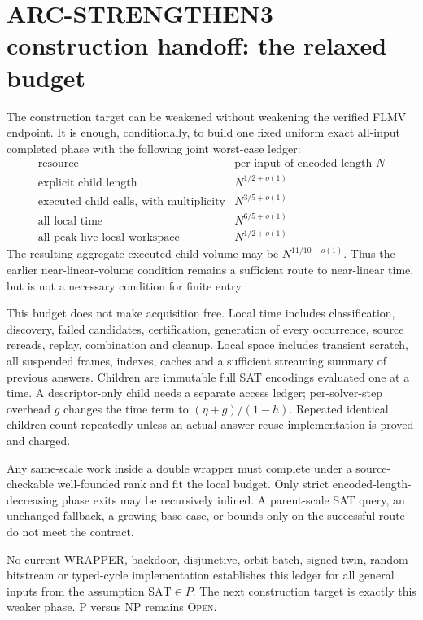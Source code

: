 \section*{ARC-STRENGTHEN3 construction handoff: the relaxed budget}

The construction target can be weakened without weakening the verified FLMV
endpoint.  It is enough, conditionally, to build one fixed uniform exact
all-input completed phase with the following joint worst-case ledger:
\[
\begin{array}{c|c}
\text{resource} & \text{per input of encoded length }N\\ \hline
\text{explicit child length} & N^{1/2+o(1)}\\
\text{executed child calls, with multiplicity} & N^{3/5+o(1)}\\
\text{all local time} & N^{6/5+o(1)}\\
\text{all peak live local workspace} & N^{1/2+o(1)}
\end{array}
\]
The resulting aggregate executed child volume may be
$N^{11/10+o(1)}$.  Thus the earlier near-linear-volume condition remains a
sufficient route to near-linear time, but is not a necessary condition for
finite entry.

This budget does not make acquisition free.  Local time includes
classification, discovery, failed candidates, certification, generation of
every occurrence, source rereads, replay, combination and cleanup.  Local
space includes transient scratch, all suspended frames, indexes, caches and
a sufficient streaming summary of previous answers.  Children are immutable
full SAT encodings evaluated one at a time.  A descriptor-only child needs a
separate access ledger; per-solver-step overhead $g$ changes the time term to
$(\eta+g)/(1-h)$.  Repeated identical children count repeatedly unless an
actual answer-reuse implementation is proved and charged.

Any same-scale work inside a double wrapper must complete under a
source-checkable well-founded rank and fit the local budget.  Only strict
encoded-length-decreasing phase exits may be recursively inlined.  A
parent-scale SAT query, an unchanged fallback, a growing base case, or bounds
only on the successful route do not meet the contract.

No current WRAPPER, backdoor, disjunctive, orbit-batch, signed-twin,
random-bitstream or typed-cycle implementation establishes this ledger for
all general inputs from the assumption $\mathrm{SAT}\in P$.  The next
construction target is exactly this weaker phase.  P versus NP remains
\textsc{Open}.

